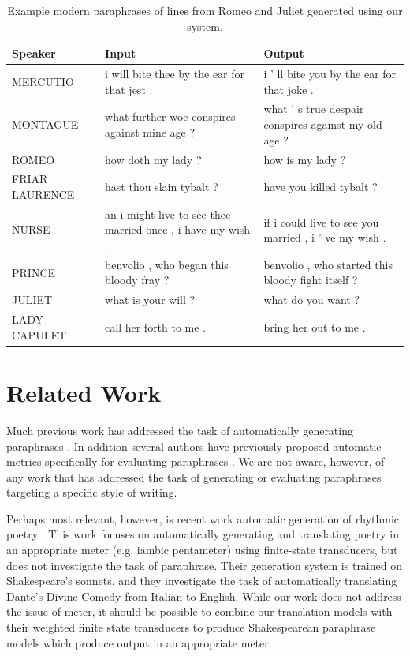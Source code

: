 \documentclass[10pt,a5paper,twoside]{article}
\begin{document}
\begin{table}
  \begin{center}
  \begin{tabular}{|l|p{1.8in}|p{1.8in}|}
    \hline
    Speaker & Input & Output \\
    \hline
    \hline
    MERCUTIO & i will bite thee by the ear for that jest . & i ’ ll bite you by the ear for that joke . \\
    \hline
    MONTAGUE & what further woe conspires against mine age ? & what ’ s true despair conspires against my old age ? \\
    \hline
    ROMEO & how doth my lady ? & how is my lady ? \\
    \hline
    FRIAR LAURENCE & hast thou slain tybalt ? & have you killed tybalt ? \\
    \hline
    NURSE & an i might live to see thee married once , i have my wish . & if i could live to see you married , i ’ ve my wish . \\
    \hline
    PRINCE & benvolio , who began this bloody fray ? & benvolio , who started this bloody fight itself ? \\
    \hline
    JULIET & what is your will ? & what do you want ? \\
    \hline
    LADY CAPULET & call her forth to me . & bring her out to me . \\
    \hline
  \end{tabular}
  \end{center}
  \caption{Example modern paraphrases of lines from Romeo and Juliet generated using our system.}
  \label{modern_examples}
\end{table}

\section{Related Work}
Much previous work has addressed the task of automatically generating paraphrases \cite{Barzilay03,dolan04,Shinyama03,Das09,bannard05,Callison-Burch08,Kok10}.  
In addition several authors have previously proposed 
automatic metrics specifically for evaluating paraphrases \cite{chen11,Callison-Burch08b,liu10}.
We are not aware, however, of any work that has addressed the task of generating or evaluating
paraphrases targeting a specific style of writing.

Perhaps most relevant, however, is recent work automatic generation of rhythmic poetry \cite{Greene10}.  This work focuses on automatically generating and translating
poetry in an appropriate meter (e.g. iambic pentameter) using finite-state transducers, but does not investigate the task of paraphrase.  Their generation system
is trained on Shakespeare's sonnets, and they investigate the task of automatically translating Dante's Divine Comedy from Italian to English.
While our work does not address the issue of meter, it should be possible to combine our translation
models with their weighted finite state transducers to produce Shakespearean paraphrase models which produce output in an appropriate meter.
\end{document}
